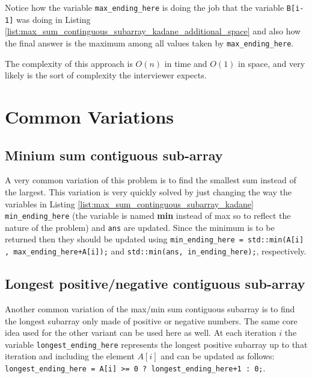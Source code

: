 

Notice how the variable \texttt{max\_ending\_here} is doing the job that the variable \texttt{B[i-1]}
was doing in Listing \ref{list:max_sum_continguous_subarray_kadane_additional_space} and also how
the final answer is the maximum among all values taken by \texttt{max\_ending\_here}.

The complexity of this approach is $O(n)$ in time and $O(1)$ in space, and very likely is the sort
of complexity the interviewer expects.

\section{Common Variations}
\subsection{Minium sum contiguous sub-array}
A very common variation of this problem is to find the smallest sum instead of the largest. This
variation is very quickly solved by just changing the  way the variables in Listing \ref{list:max_sum_continguous_subarray_kadane}
\texttt{min\_ending\_here} (the variable is named \textbf{min} instead of max so to reflect the nature of the
problem) and \texttt{ans} are updated. Since the minimum is to be returned then they should be
updated using \lstinline[columns=fixed]{min_ending_here = std::min(A[i] , max_ending_here+A[i]);}
and \lstinline[columns=fixed]{std::min(ans, in_ending_here);}, respectively.  

\subsection{Longest positive/negative contiguous sub-array}
Another common variation of the max/min sum contiguous subarray is to find the longest subarray only
made of positive or negative numbers. The same core idea used for the other variant can be used here
as well. At each iteration $i$ the variable \texttt{longest\_ending\_here} represents the longest
positive subarray up to that iteration and including the element $A[i]$ and can be updated as
follows: \lstinline[columns=fixed]{longest_ending_here = A[i] >= 0 ? longest_ending_here+1 : 0;}.
